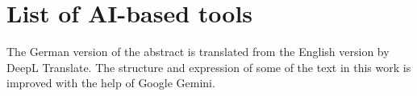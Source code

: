 \section*{List of AI-based tools}  

The German version of the abstract is translated from the English version by DeepL Translate. The structure and expression of some of the text in this work is improved with the help of Google Gemini. 
